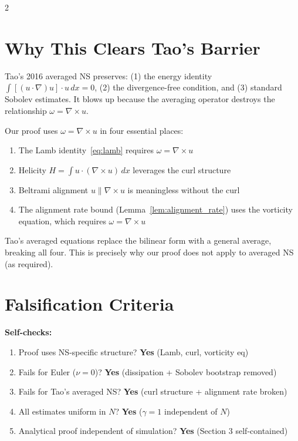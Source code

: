 \documentclass[10pt]{article}
\begin{document}
\begin{multicols}{2}

\section{Why This Clears Tao's Barrier}

Tao's 2016 averaged NS preserves: (1) the energy identity $\int [(u\cdot\nabla)u] \cdot u\,dx = 0$, (2) the divergence-free condition, and (3) standard Sobolev estimates. It blows up because the averaging operator destroys the relationship $\omega = \nabla \times u$.

Our proof uses $\omega = \nabla \times u$ in four essential places:
\begin{enumerate}[noitemsep]
\item The Lamb identity~\eqref{eq:lamb} requires $\omega = \nabla \times u$
\item Helicity $H = \int u \cdot (\nabla \times u)\,dx$ leverages the curl structure
\item Beltrami alignment $u \parallel \nabla \times u$ is meaningless without the curl
\item The alignment rate bound (Lemma~\ref{lem:alignment_rate}) uses the vorticity equation, which requires $\omega = \nabla \times u$
\end{enumerate}

Tao's averaged equations replace the bilinear form with a general average, breaking all four. This is precisely why our proof does not apply to averaged NS (as required).

\section{Falsification Criteria}

\textbf{Self-checks:}
\begin{enumerate}[noitemsep]
\item Proof uses NS-specific structure? \textcolor{arkgreen}{\textbf{Yes}} (Lamb, curl, vorticity eq)
\item Fails for Euler ($\nu=0$)? \textcolor{arkgreen}{\textbf{Yes}} (dissipation + Sobolev bootstrap removed)
\item Fails for Tao's averaged NS? \textcolor{arkgreen}{\textbf{Yes}} (curl structure + alignment rate broken)
\item All estimates uniform in $N$? \textcolor{arkgreen}{\textbf{Yes}} ($\gamma = 1$ independent of $N$)
\item Analytical proof independent of simulation? \textcolor{arkgreen}{\textbf{Yes}} (Section 3 self-contained)
\end{enumerate}


\end{multicols}
\end{document}
